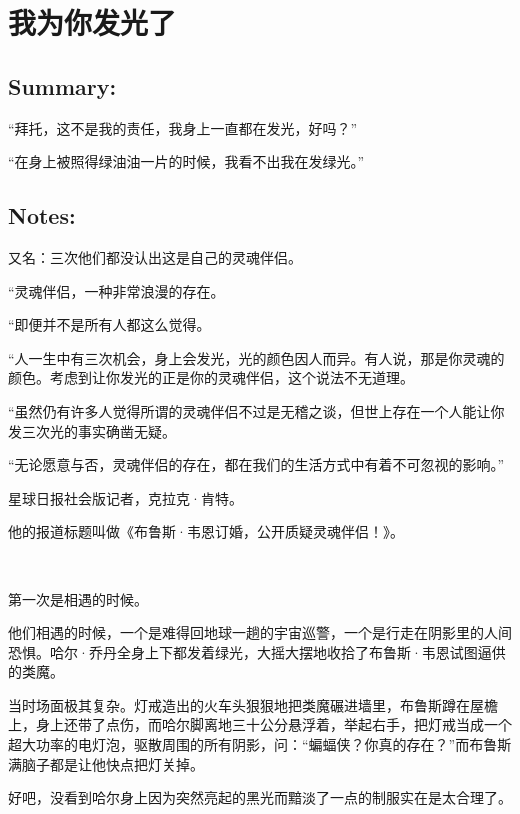 \documentclass[../main.tex]{subfiles}
\begin{document}
\pagestyle{mystyle}


\chapter{我为你发光了}

\vspace{3cm}

\section*{Summary:}

“拜托，这不是我的责任，我身上一直都在发光，好吗？”

“在身上被照得绿油油一片的时候，我看不出我在发绿光。”

\vspace{3em}

\section*{Notes:}

又名：三次他们都没认出这是自己的灵魂伴侣。

\newpage

“灵魂伴侣，一种非常浪漫的存在。

“即便并不是所有人都这么觉得。

“人一生中有三次机会，身上会发光，光的颜色因人而异。有人说，那是你灵魂的颜色。考虑到让你发光的正是你的灵魂伴侣，这个说法不无道理。

“虽然仍有许多人觉得所谓的灵魂伴侣不过是无稽之谈，但世上存在一个人能让你发三次光的事实确凿无疑。

“无论愿意与否，灵魂伴侣的存在，都在我们的生活方式中有着不可忽视的影响。”

星球日报社会版记者，克拉克·肯特。

他的报道标题叫做《布鲁斯·韦恩订婚，公开质疑灵魂伴侣！》。

~\

第一次是相遇的时候。

他们相遇的时候，一个是难得回地球一趟的宇宙巡警，一个是行走在阴影里的人间恐惧。哈尔·乔丹全身上下都发着绿光，大摇大摆地收拾了布鲁斯·韦恩试图逼供的类魔。

当时场面极其复杂。灯戒造出的火车头狠狠地把类魔碾进墙里，布鲁斯蹲在屋檐上，身上还带了点伤，而哈尔脚离地三十公分悬浮着，举起右手，把灯戒当成一个超大功率的电灯泡，驱散周围的所有阴影，问：“蝙蝠侠？你真的存在？”而布鲁斯满脑子都是让他快点把灯关掉。

好吧，没看到哈尔身上因为突然亮起的黑光而黯淡了一点的制服实在是太合理了。
\end{document}
